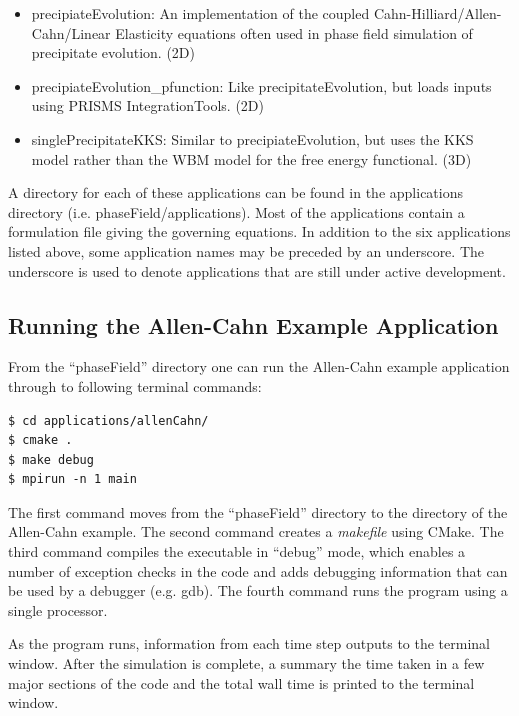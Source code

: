 \documentclass[10pt]{article} %
\begin{document}
\begin{itemize}
\item precipiateEvolution: An implementation of the coupled Cahn-Hilliard/Allen-Cahn/Linear Elasticity equations often used in phase field simulation of precipitate evolution. (2D)
\item precipiateEvolution\_pfunction: Like precipitateEvolution, but loads inputs using PRISMS IntegrationTools. (2D)
\item singlePrecipitateKKS: Similar to precipiateEvolution, but uses the KKS model rather than the WBM model for the free energy functional. (3D)
\end{itemize}

A directory for each of these applications can be found in the applications directory (i.e. phaseField/applications). Most of the applications contain a formulation file giving the governing equations. In addition to the six applications listed above, some application names may be preceded by an underscore. The underscore is used to denote applications that are still under active development.

\subsection{Running the Allen-Cahn Example Application} \label{allen_cahn_instructions}
From the ``phaseField'' directory one can run the Allen-Cahn example application through to following terminal commands:
\begin{lstlisting}
$ cd applications/allenCahn/ 
$ cmake . 
$ make debug 
$ mpirun -n 1 main 
\end{lstlisting}

The first command moves from the ``phaseField'' directory to the directory of the Allen-Cahn example. The second command creates a \emph{makefile} using CMake. The third command compiles the executable in ``debug'' mode, which enables a number of exception checks in the code and adds debugging information that can be used by a debugger (e.g. gdb). The fourth command runs the program using a single processor.

As the program runs, information from each time step outputs to the terminal window. After the simulation is complete, a summary the time taken in a few major sections of the code and the total wall time is printed to the terminal window. 
\end{document}
